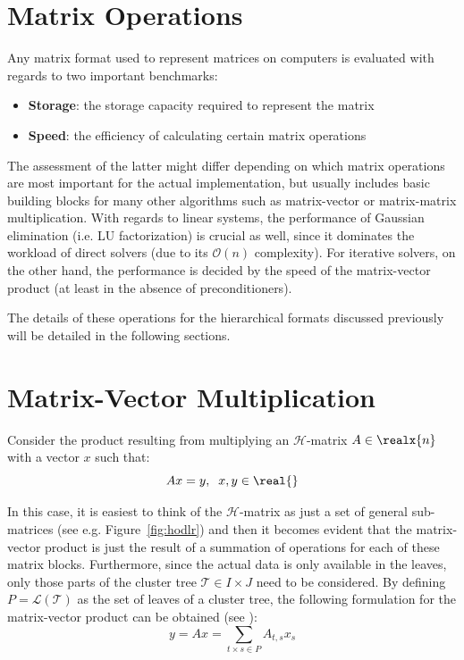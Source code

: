 \section{Matrix Operations}
\label{sec:matrix_operations}

Any matrix format used to represent matrices on computers is evaluated with regards to two important benchmarks:
\begin{itemize}
    \item \textbf{Storage}: the storage capacity required to represent the matrix
    \item \textbf{Speed}: the efficiency of calculating certain matrix operations
\end{itemize}

The assessment of the latter might differ depending on which matrix operations are most important for the actual implementation, but usually includes basic building blocks for many other algorithms such as matrix-vector or matrix-matrix multiplication. With regards to linear systems, the performance of Gaussian elimination (i.e. LU factorization) is crucial as well, since it dominates the workload of direct solvers (due to its $\mathcal{O}(n)$ complexity). For iterative solvers, on the other hand, the performance is decided by the speed of the matrix-vector product (at least in the absence of preconditioners).

The details of these operations for the hierarchical formats discussed previously will be detailed in the following sections. 

\section{Matrix-Vector Multiplication}
\label{sec:matrix_vector}

Consider the product resulting from multiplying an  $\mathcal{H}$-matrix $A \in \realx{n}$ with a vector $x$ such that:
\begin{equation}
    Ax = y, \; \; x,y \in \real{}
\end{equation}

\noindent In this case, it is easiest to think of the $\mathcal{H}$-matrix as just a set of general sub-matrices (see e.g. Figure~\hyperref[fig:hodlr]{\ref{fig:hodlr}}) and then it becomes evident that the matrix-vector product is just the result of a summation of operations for each of these matrix blocks. Furthermore, since the actual data is only available in the leaves, only those parts of the cluster tree $\mathcal{T} \in I \times J$ need to be considered. By defining $P = \mathcal{L}(\mathcal{T})$ as the set of leaves of a cluster tree, the following formulation for the matrix-vector product can be obtained (see  \cite{bebendorf_hierarchical_2008}):
\begin{equation}
    y=Ax = \sum_{t \times s \in P}{A_{t,s}x_s}
\end{equation}

